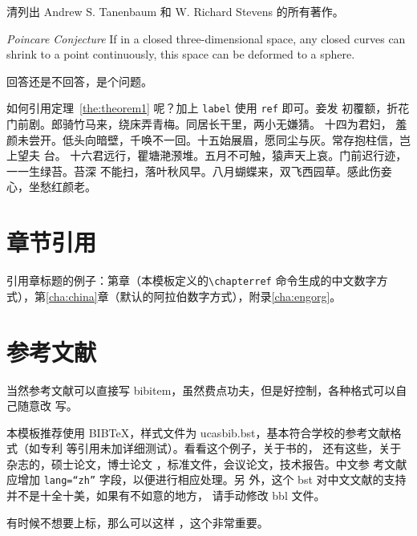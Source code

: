 \begin{exercise}
  清列出 Andrew S. Tanenbaum 和 W. Richard Stevens 的所有著作。
\end{exercise}

\begin{conjecture} \textit{Poincare Conjecture} If in a closed three-dimensional
  space, any closed curves can shrink to a point continuously, this space can be
  deformed to a sphere.
\end{conjecture}

\begin{problem}
 回答还是不回答，是个问题。 
\end{problem}

如何引用定理~\ref{the:theorem1} 呢？加上 \verb|label| 使用 \verb|ref| 即可。妾发
初覆额，折花门前剧。郎骑竹马来，绕床弄青梅。同居长干里，两小无嫌猜。 十四为君妇，
羞颜未尝开。低头向暗壁，千唤不一回。十五始展眉，愿同尘与灰。常存抱柱信，岂上望夫
台。 十六君远行，瞿塘滟滪堆。五月不可触，猿声天上哀。门前迟行迹，一一生绿苔。苔深
不能扫，落叶秋风早。八月蝴蝶来，双飞西园草。感此伤妾心，坐愁红颜老。

\section{章节引用}
\label{sec:bib}

引用章标题的例子：第章（本模板定义的\verb|\chapterref|
命令生成的中文数字方式），第\ref{cha:china}章（默认的阿拉伯数字方式），附录\ref{cha:engorg}。

\section{参考文献}
\label{sec:bib}
当然参考文献可以直接写 bibitem，虽然费点功夫，但是好控制，各种格式可以自己随意改
写。

本模板推荐使用 BIB\TeX，样式文件为 ucasbib.bst，基本符合学校的参考文献格式（如专利
等引用未加详细测试）。看看这个例子，关于书的\cite{tex, companion, ColdSources}，
还有这些\cite{Krasnogor2004e, clzs, zjsw}，关于杂志的\cite{ELIDRISSI94,
  MELLINGER96, SHELL02}，硕士论文\cite{zhubajie, metamori2004}，博士论文
\cite{shaheshang, FistSystem01}，标准文件\cite{IEEE-1363}，会议论文\cite{DPMG,kocher99}，技术报告\cite{NPB2}。中文参
考文献\cite{cnarticle}应增加 \texttt{lang=``zh''} 字段，以便进行相应处理。另
外，这个 bst 对中文文献\cite{cnproceed}的支持并不是十全十美，如果有不如意的地方，
请手动修改 bbl 文件。

有时候不想要上标，那么可以这样 ，这个非常重要。


